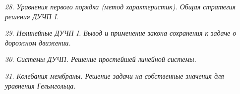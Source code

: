 \newpage %

\emph{28. Уравнения первого порядка (метод характеристик). Общая стратегия
решения ДУЧП I.}

\newpage %

\emph{29. Нелинейные ДУЧП I. Вывод и применение закона сохранения к задаче о
дорожном движении.}

\newpage %

\emph{30. Системы ДУЧП. Решение простейшей линейной системы.}

\newpage %

\emph{31. Колебания мембраны. Решение задачи на собственные значения для
уравнения Гельмгольца.}


